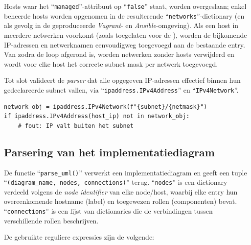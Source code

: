 Hosts waar het ``\texttt{managed}''-attribuut op ``\texttt{false}'' staat, worden overgeslaan; enkel beheerde hosts worden opgenomen in de resulterende ``\texttt{networks}''-dictionary (en als gevolg in de geproduceerde \emph{Vagrant}- en \emph{Ansible}-omgeving). Als een host in meerdere netwerken voorkomt (zoals toegelaten voor de ), worden de bijkomende IP-adressen en netwerknamen eenvoudigweg toegevoegd aan de bestaande entry. Van zodra de loop afgerond is, worden netwerken zonder hosts verwijderd en wordt voor elke host het correcte subnet mask per netwerk toegevoegd.

Tot slot valideert de \emph{parser} dat alle opgegeven IP-adressen effectief binnen hun gedeclareerde subnet vallen, via ``\texttt{ipaddress.IPv4Address}'' en ``\texttt{IPv4Network}''.

\begin{codeblockfixed}
  \begin{codeblock}
    \begin{verbatim}
network_obj = ipaddress.IPv4Network(f"{subnet}/{netmask}")
if ipaddress.IPv4Address(host_ip) not in network_obj:
    # fout: IP valt buiten het subnet
\end{verbatim}
    \caption[IP-adresvalidatie in ``\texttt{parse\_nwdiag()}'']{Controle of het IP-adres van een host binnen het gedeclareerde subnet valt.}
    \label{code:nwdiag_ip_validation}
  \end{codeblock}
\end{codeblockfixed}

\subsection{Parsering van het implementatiediagram}%
\label{subsec:parsering_uml}

De functie ``\texttt{parse\_uml()}'' verwerkt een implementatiediagram en geeft een tuple ``\texttt{(diagram\_name, nodes, connections)}'' terug. ``\texttt{nodes}'' is een dictionary verdeeld volgens de \emph{node identifier} van elke node/host, waarbij elke entry hun overeenkomende hostname (label) en toegewezen rollen (componenten) bevat. ``\texttt{connections}'' is een lijst van dictionaries die de verbindingen tussen verschillende rollen beschrijven.

De gebruikte reguliere expressies zijn de volgende:

